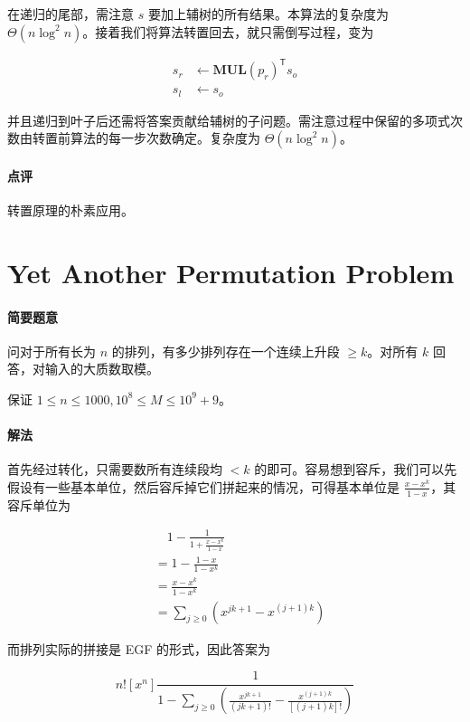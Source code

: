 \documentclass[12pt]{ctexart}
\theoremstyle{theorem}
\theoremstyle{theorem}
\begin{document}
在递归的尾部，需注意 $s$ 要加上辅树的所有结果。本算法的复杂度为 $\Theta(n\log ^2n)$。接着我们将算法转置回去，就只需倒写过程，变为

\begin{align*}
s_r & \leftarrow \mathbf{MUL}(p_r)^{\mathsf T} s_o \\
s_l & \leftarrow s_o
\end{align*}

并且递归到叶子后还需将答案贡献给辅树的子问题。需注意过程中保留的多项式次数由转置前算法的每一步次数确定。复杂度为 $\Theta(n\log ^2n)$。

\paragraph{点评} 转置原理的朴素应用。

\newpage

\section{Yet Another Permutation Problem}

\paragraph{简要题意}

问对于所有长为 $n$ 的排列，有多少排列存在一个连续上升段 $\ge k$。对所有 $k$ 回答，对输入的大质数取模。

保证 $1\le n\le 1000, 10^8\le M\le 10^9+9$。

\paragraph{解法}

首先经过转化，只需要数所有连续段均 $<k$ 的即可。容易想到容斥，我们可以先假设有一些基本单位，然后容斥掉它们拼起来的情况，可得基本单位是 $\frac{x-x^k}{1-x}$，其容斥单位为

$$
\begin{aligned}
&\quad 1-\frac 1{1+\frac{x-x^k}{1-x}}\\
&= 1-\frac{1-x}{1-x^k}\\
&= \frac{x-x^k}{1-x^k}\\
&= \sum_{j\ge 0} \left(x^{jk+1} - x^{(j+1)k}\right)
\end{aligned}
$$

而排列实际的拼接是 EGF 的形式，因此答案为

$$
n![x^n] \frac 1{\displaystyle1 - \sum_{j\ge 0} \left( \frac{x^{jk+1}}{(jk+1)!}  - \frac{x^{(j+1)k}}{[(j+1)k]!}\right)}
$$
\end{document}
